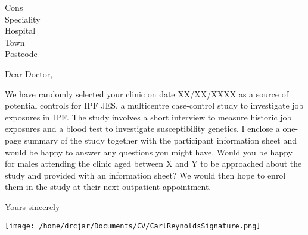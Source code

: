 \documentclass[ipfjes,letterpaper,pagesize,UScommercial9]{scrlttr2}
\begin{document}
\begin{letter}{Cons \\ Speciality \\ Hospital \\ Town \\ Postcode}


\opening{Dear Doctor,}

    We have randomly selected your clinic on date XX/XX/XXXX as a source of potential controls for IPF JES, a multicentre case-control study to investigate job exposures in IPF.
    The study involves a short interview to measure historic job exposures and a blood test to investigate susceptibility genetics. I enclose a one-page summary of the study together with the participant information sheet and would be happy to answer any questions you might have.
    Would you be happy for males attending the clinic aged between X and Y to be approached about the study and provided with an information sheet? We would then hope to enrol them in the study at their next outpatient appointment.


\closing{Yours sincerely}

    \texttt{[image: /home/drcjar/Documents/CV/CarlReynoldsSignature.png]}

\end{letter}
\end{document}
